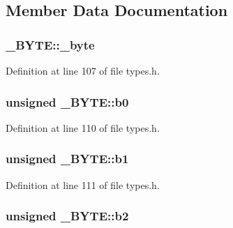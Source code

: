 \subsection{Member Data Documentation}
\subsubsection[{\texorpdfstring{\+\_\+byte}{_byte}}]{ \+\_\+\+B\+Y\+T\+E\+::\+\_\+byte}\hypertarget{union___b_y_t_e_afcc1405a7fdc66607fe6ae4ef18b6d69}{}\label{union___b_y_t_e_afcc1405a7fdc66607fe6ae4ef18b6d69}


Definition at line 107 of file types.\+h.

\subsubsection[{\texorpdfstring{b0}{b0}}]{\setlength{\rightskip}{0pt plus 5cm}unsigned \+\_\+\+B\+Y\+T\+E\+::b0}\hypertarget{union___b_y_t_e_a6fb1aa085edab05123056d1a96a2211e}{}\label{union___b_y_t_e_a6fb1aa085edab05123056d1a96a2211e}


Definition at line 110 of file types.\+h.

\subsubsection[{\texorpdfstring{b1}{b1}}]{\setlength{\rightskip}{0pt plus 5cm}unsigned \+\_\+\+B\+Y\+T\+E\+::b1}\hypertarget{union___b_y_t_e_a809339279845dab2c5d170e5ce120afc}{}\label{union___b_y_t_e_a809339279845dab2c5d170e5ce120afc}


Definition at line 111 of file types.\+h.

\subsubsection[{\texorpdfstring{b2}{b2}}]{\setlength{\rightskip}{0pt plus 5cm}unsigned \+\_\+\+B\+Y\+T\+E\+::b2}\hypertarget{union___b_y_t_e_a4e08cbe05b806be7f2e73120fb78d926}{}\label{union___b_y_t_e_a4e08cbe05b806be7f2e73120fb78d926}


